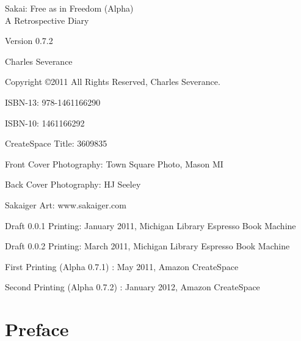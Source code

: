 \documentclass[12pt]{book}
\newcommand{\theversion}{0.7.2}
\begin{document}
\frontmatter

\thispagestyle{empty}

\pagebreak
\thispagestyle{empty}

\begin{flushright}
\vspace*{2.0in}

\begin{spacing}{3}
{\huge Sakai: Free as in Freedom (Alpha)}\\
{\Large A Retrospective Diary}
\end{spacing}

\vspace{0.25in}

Version \theversion

\vspace{0.5in}


{\Large
Charles Severance\\
}


\vspace{2.25in}


\end{flushright}


\pagebreak
\thispagestyle{empty}

{\small
Copyright \copyright 2011 All Rights Reserved, Charles Severance.

ISBN-13: 978-1461166290

ISBN-10: 1461166292

CreateSpace Title: 3609835

Front Cover Photography: Town Square Photo, Mason MI

Back Cover Photography: HJ Seeley

Sakaiger Art: www.sakaiger.com

Draft 0.0.1 Printing: January 2011, Michigan Library Espresso Book Machine

Draft 0.0.2 Printing: March 2011, Michigan Library Espresso Book Machine

First Printing (Alpha 0.7.1) : May 2011, Amazon CreateSpace

Second Printing (Alpha 0.7.2) : January 2012, Amazon CreateSpace

} %

\chapter*{Preface}
\end{document}
